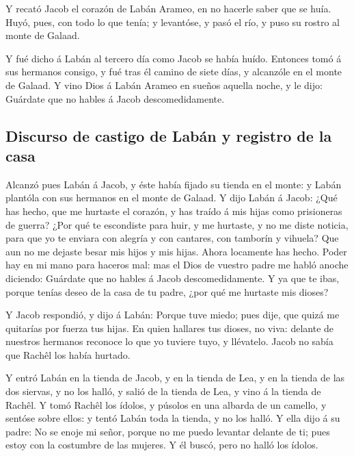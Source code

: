  Y recató Jacob el corazón de Labán Arameo, en no hacerle
saber que se huía.  Huyó, pues, con todo lo que tenía; y
levantóse, y pasó el río, y puso su rostro al monte de Galaad.

 Y fué dicho á Labán al tercero día como Jacob se había
huído.  Entonces tomó á sus hermanos consigo, y fué tras
él camino de siete días, y alcanzóle en el monte de Galaad.
 Y vino Dios á Labán Arameo en sueños aquella noche, y le
dijo: Guárdate que no hables á Jacob descomedidamente.

\hypertarget{discurso-de-castigo-de-labuxe1n-y-registro-de-la-casa}{%
\subsection{Discurso de castigo de Labán y registro de la
casa}\label{discurso-de-castigo-de-labuxe1n-y-registro-de-la-casa}}

 Alcanzó pues Labán á Jacob, y éste había fijado su
tienda en el monte: y Labán plantóla con sus hermanos en el monte de
Galaad.  Y dijo Labán á Jacob: ¿Qué has hecho, que me
hurtaste el corazón, y has traído á mis hijas como prisioneras de
guerra?  ¿Por qué te escondiste para huir, y me hurtaste,
y no me diste noticia, para que yo te enviara con alegría y con
cantares, con tamborín y vihuela?  Que aun no me dejaste
besar mis hijos y mis hijas. Ahora locamente has hecho. 
Poder hay en mi mano para haceros mal: mas el Dios de vuestro padre me
habló anoche diciendo: Guárdate que no hables á Jacob descomedidamente.
 Y ya que te ibas, porque tenías deseo de la casa de tu
padre, ¿por qué me hurtaste mis dioses?

 Y Jacob respondió, y dijo á Labán: Porque tuve miedo;
pues dije, que quizá me quitarías por fuerza tus hijas. 
En quien hallares tus dioses, no viva: delante de nuestros hermanos
reconoce lo que yo tuviere tuyo, y llévatelo. Jacob no sabía que Rachêl
los había hurtado.

 Y entró Labán en la tienda de Jacob, y en la tienda de
Lea, y en la tienda de las dos siervas, y no los halló, y salió de la
tienda de Lea, y vino á la tienda de Rachêl.  Y tomó
Rachêl los ídolos, y púsolos en una albarda de un camello, y sentóse
sobre ellos: y tentó Labán toda la tienda, y no los halló.
 Y ella dijo á su padre: No se enoje mi señor, porque no
me puedo levantar delante de ti; pues estoy con la costumbre de las
mujeres. Y él buscó, pero no halló los ídolos.

